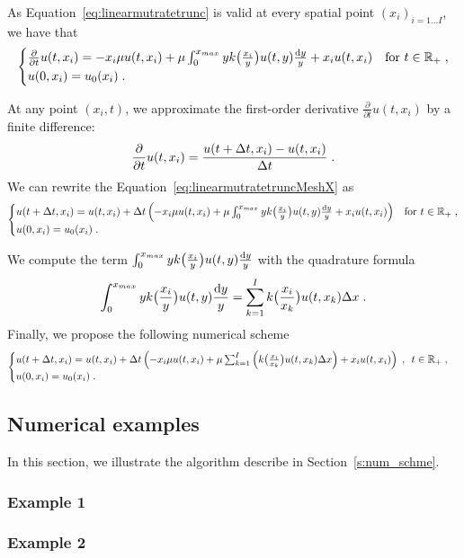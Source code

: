 \documentclass[11pt]{amsart}
\begin{document}
As Equation~\eqref{eq:linearmutratetrunc} is valid at every spatial point $(x_i)_{i = 1 \ldots I}$, we have that
\begin{equation}
    \begin{cases}
    \frac{\partial}{\partial t}u(t,x_i) = - x_i\mu u(t,x_i) + \mu \int_{0}^{x_{max}} y k\big( \frac{x_i}{y}\big) u(t,y) \frac{\mathrm dy}{y} + x_iu(t,x_i)
	& \text{for }t \in \mathbb{R}_+ \; ,
    \\
    u(0, x_i) = u_0(x_i)
    \; .
    \end{cases}
    \label{eq:linearmutratetruncMeshX}
\end{equation}


At any point $(x_i, t)$, we approximate the first-order derivative $\frac{\partial}{\partial t}u(t,x_i)$ by a finite difference:
$$\frac{\partial}{\partial t}u(t,x_i) = \frac{u(t+\Delta t,x_i) - u(t,x_i)}{\Delta t}
\; .$$
We can rewrite the Equation~\eqref{eq:linearmutratetruncMeshX} as
\begin{equation}
    \begin{cases}
    u(t+\Delta t,x_i) = u(t,x_i) + \Delta t \left(- x_i\mu u(t,x_i) + \mu \int_{0}^{x_{max}} y k\big( \frac{x_i}{y}\big) u(t,y) \frac{\mathrm dy}{y} + x_iu(t,x_i) \right)
	
	& \text{for }t \in \mathbb{R}_+ \; ,
	\\ 
	u(0, x_i) = u_0(x_i)
	\; .
    \end{cases}
    \label{eq:linearmutratetruncMeshXX}
\end{equation}

We compute the term $\int_{0}^{x_{max}} y k\big( \frac{x_i}{y}\big) u(t,y) \frac{\mathrm dy}{y}$ with the quadrature formula
$$ \int_{0}^{x_{max}} y k\big( \frac{x_i}{y}\big) u(t,y) \frac{\mathrm dy}{y}
= \sum_{k = 1}^I k \big( \frac{x_i}{x_k}\big) u(t,x_k) \Delta x \; .
$$ 
Finally, we propose the following numerical scheme
\begin{equation}
    \begin{cases}
    u(t+\Delta t,x_i) = u(t,x_i) + \Delta t \left(- x_i\mu u(t,x_i) + \mu \sum_{k = 1}^I \left(k \big( \frac{x_i}{x_k}\big) u(t,x_k) \Delta x \right) + x_iu(t,x_i) \right)
	\; , \enspace
	 t \in \mathbb{R}_+ \; ,
     \\
	u(0, x_i) = u_0(x_i)
    \; .
    \end{cases}
    \label{eq:numericalScheme}
\end{equation}

\subsection{Numerical examples} \mbox{}

In this section, we illustrate the algorithm describe in Section~\ref{s:num_schme}. 
\subsubsection{Example 1}
\subsubsection{Example 2}



\end{document}
